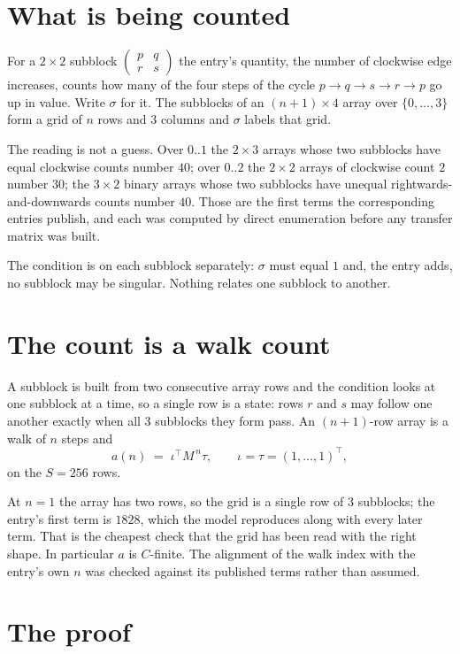 \documentclass[11pt,a4paper]{article}
\theoremstyle{plain}
\theoremstyle{definition}
\begin{document}
\section{What is being counted}

For a $2\times2$ subblock $\begin{pmatrix}p&q\\r&s\end{pmatrix}$ the
entry's quantity, the number of clockwise edge increases, counts how many of the four steps of the cycle $p\to q\to s\to r\to p$ go up in value. Write $\sigma$ for it. The subblocks of an
$(n+1)\times4$ array over $\{0,\dots,3\}$ form a grid of $n$ rows and $3$
columns and $\sigma$ labels that grid.

The reading is not a guess. Over $0..1$ the $2\times3$ arrays whose two subblocks have equal
clockwise counts number $40$; over $0..2$ the $2\times2$ arrays of clockwise count $2$ number
$30$; the $3\times2$ binary arrays whose two subblocks have unequal rightwards-and-downwards
counts number $40$. Those are the first terms the corresponding entries publish, and each was
computed by direct enumeration before any transfer matrix was built.

The condition is on each subblock separately: $\sigma$ must equal $1$ and, the entry adds, no subblock may be singular. Nothing
relates one subblock to another.

\section{The count is a walk count}

A subblock is built from two consecutive array rows and the condition looks
at one subblock at a time, so a single row is a state: rows $r$ and $s$ may follow one another
exactly when all $3$ subblocks they form pass. An $(n+1)$-row array is a walk of $n$ steps and
\[
a(n)\;=\;\iota^{\!\top}M^{\,n}\tau,\qquad\iota=\tau=(1,\dots,1)^{\!\top},
\]
on the $S=256$ rows.

At $n=1$ the array has two rows, so the grid is a single row of $3$
subblocks; the entry's first term is $1828$, which the model
reproduces along with every later term. That is the cheapest check that the grid has been read
with the right shape.
In particular $a$ is $C$-finite. The alignment of the walk index with the entry's own $n$ was
checked against its published terms rather than assumed.

\section{The proof}
\end{document}
